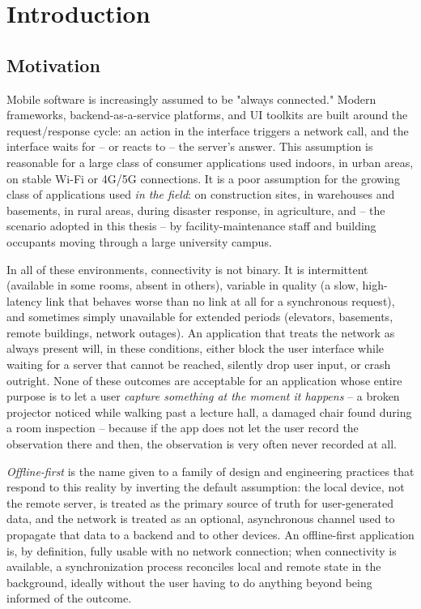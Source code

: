 \chapter{Introduction}
\label{ch:introduction}

\section{Motivation}
\label{sec:motivation}

Mobile software is increasingly assumed to be "always connected." Modern
frameworks, backend-as-a-service platforms, and UI toolkits are built around
the request/response cycle: an action in the interface triggers a network
call, and the interface waits for -- or reacts to -- the server's answer.
This assumption is reasonable for a large class of consumer applications
used indoors, in urban areas, on stable Wi-Fi or 4G/5G connections. It is a
poor assumption for the growing class of applications used \emph{in the
field}: on construction sites, in warehouses and basements, in rural areas,
during disaster response, in agriculture, and -- the scenario adopted in
this thesis -- by facility-maintenance staff and building occupants moving
through a large university campus.

In all of these environments, connectivity is not binary. It is
intermittent (available in some rooms, absent in others), variable in
quality (a slow, high-latency link that behaves worse than no link at all
for a synchronous request), and sometimes simply unavailable for extended
periods (elevators, basements, remote buildings, network outages). An
application that treats the network as always present will, in these
conditions, either block the user interface while waiting for a server that
cannot be reached, silently drop user input, or crash outright. None of
these outcomes are acceptable for an application whose entire purpose is to
let a user \emph{capture something at the moment it happens} -- a broken
projector noticed while walking past a lecture hall, a damaged chair found
during a room inspection -- because if the app does not let the user record
the observation there and then, the observation is very often never
recorded at all.

\emph{Offline-first} is the name given to a family of design and
engineering practices that respond to this reality by inverting the default
assumption: the local device, not the remote server, is treated as the
primary source of truth for user-generated data, and the network is treated
as an optional, asynchronous channel used to propagate that data to a
backend and to other devices. An offline-first application is, by
definition, fully usable with no network connection; when connectivity is
available, a synchronization process reconciles local and remote state in
the background, ideally without the user having to do anything beyond being
informed of the outcome.

